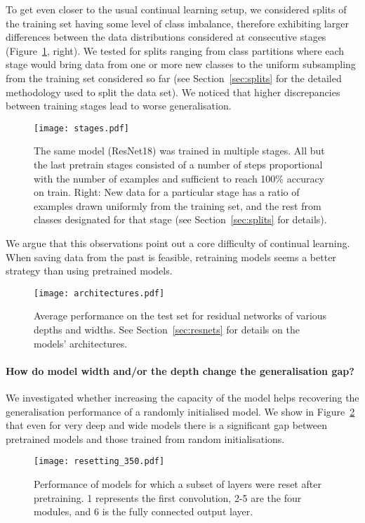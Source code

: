 To get even closer to the usual continual learning setup, we considered splits of the training set having some level of class imbalance, therefore exhibiting larger differences between the data distributions considered at consecutive stages (Figure~\ref{fig:stages}, right). We tested for splits ranging from class partitions where each stage would bring data from one or more new classes to the uniform subsampling from the training set considered so far (see Section~\ref{sec:splits} for the detailed methodology used to split the data set). We noticed that higher discrepancies between training stages lead to worse generalisation.

\begin{figure}[h!tb]
    \centering%
    \texttt{[image: stages.pdf]}
    \caption{The same model (ResNet18) was trained in multiple stages. All but the last pretrain stages consisted of a number of steps proportional with the number of examples and sufficient to reach 100\% accuracy on train. Right: New data for a particular stage has a ratio of examples drawn uniformly from the training set, and the rest from classes designated for that stage (see Section~\ref{sec:splits} for details).}
    \label{fig:stages}
\end{figure}


We argue that this observations point out a core difficulty of continual learning. When saving data from the past is feasible, retraining models seems a better strategy than using pretrained models.

\begin{figure}[h!tb]
    \centering%
    \texttt{[image: architectures.pdf]}
    \caption{Average performance on the test set for residual networks of various depths and widths. See Section~\ref{sec:resnets} for details on the models' architectures.}
    \label{fig:architectures}
\end{figure}

\paragraph{How do model width and/or the depth change the generalisation gap?}
We investigated whether increasing the capacity of the model helps recovering the generalisation performance of a randomly initialised model. We show in Figure~\ref{fig:architectures} that even for very deep and wide models there is a significant gap between pretrained models and those trained from random initialisations.
\begin{figure}[h!tb]
    \centering%
    \texttt{[image: resetting\_350.pdf]}
    \caption{Performance of models for which a subset of layers were reset after pretraining. 1 represents the first convolution, 2-5 are the four modules, and 6 is the fully connected output layer.}
    \label{fig:reset}
\end{figure}
